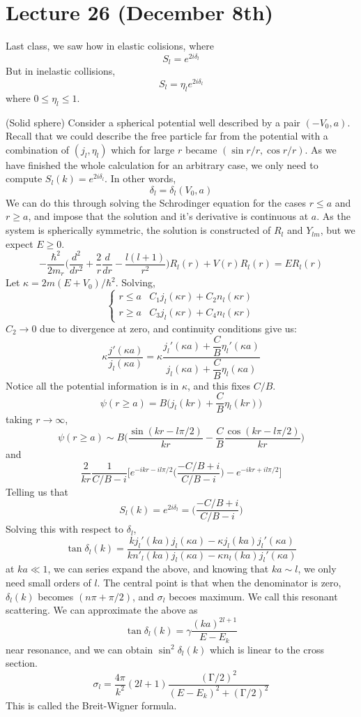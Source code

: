 \section{Lecture 26 (December 8th)}
\begin{recall}
Last class, we saw how in elastic colisions, where
\[S_{l}=e^{2i\delta _{l}}\]
But in inelastic collisions,
\[S_{l}=\eta _{l}e^{2i\delta _{l}}\]
where $0\leq \eta _{l}\leq 1$. 
\end{recall}
\vspace{2ex}
\begin{ex}
(Solid sphere) Consider a spherical potential well described by a pair $(-V_0,a)$. Recall that we could describe the free particle far from the potential with a combination of $(j_{l},\eta _{l})$ which for large $r$ became $(\sin r/r,\cos r/r)$. As we have finished the whole calculation for an arbitrary case, we only need to compute $S_{l}(k)=e^{2i\delta _{l}}$. In other words,
\[\delta _{l}=\delta _{l}(V_0,a)\]
We can do this through solving the Schrodinger equation for the cases $r\leq a$ and $r\geq a$, and impose that the solution and it's derivative is continuous at $a$. As the system is spherically symmetric, the solution is constructed of $R_{l}$ and $Y_{lm}$, but we expect $E\geq 0$. 
\[-\dfrac{\hbar ^2}{2m_{r}}\Big(\dfrac{d ^2}{d r^2}+\dfrac{2}{r}\dfrac{d }{d r}-\dfrac{l(l+1)}{r^2}  \Big)R_{l}(r)+V(r)R_{l}(r)=ER_{l}(r)\]
Let $\kappa =2m(E+V_0)/\hbar ^2$. Solving,
\[\begin{cases}
r\leq a& C_1j_{l}(\kappa r)+C_2n_{l}(\kappa r)\\
r\geq a& C_3j_{l}(\kappa r)+C_4n_{l}(\kappa r)
\end{cases}\]
$C_2\rightarrow 0$ due to divergence at zero, and continuity conditions give us:
\[\kappa \dfrac{j'(\kappa a)}{j_{l}(\kappa a)}=\kappa \dfrac{j_{l}'(\kappa a)+\dfrac{C}{B}\eta _{l}'(\kappa a)}{j_{l}(\kappa a)+\dfrac{C}{B}\eta _{l}(\kappa a)}\]
Notice all the potential information is in $\kappa $, and this fixes $C/B$. 
\[\psi (r\geq a)=B\Big(j_{l}(k r)+\dfrac{C}{B}\eta _{l}(k r)\Big)\]
taking $r\rightarrow \infty $, 
\[\psi (r\geq a)\sim B\Big(\dfrac{\sin (k r-l\pi /2)}{kr}-\dfrac{C}{B}\dfrac{\cos (kr-l\pi /2)}{kr}\Big)\]
and
\[\dfrac{2}{kr}\dfrac{1}{C/B-i}\Big[e^{-ikr-il\pi /2}\Big(\dfrac{-C/B+i}{C/B-i}\Big)-e^{-ikr+il\pi /2}\Big]\]
Telling us that 
\[S_{l}(k)=e^{2i\delta _{l}}=\Big(\dfrac{-C/B+i}{C/B-i}\Big)\]
Solving this with respect to $\delta _{l}$,
\[\tan \delta _{l}(k)=\dfrac{kj_{l}'(ka)j_{l}(\kappa a)-\kappa j_{l}(ka)j_{l}'(\kappa a)}{kn'_{l}(ka)j_{l}(\kappa a)-\kappa n_{l}(ka)j_{l}'(\kappa a)}\]
at $k a\ll 1$, we can series expand the above, and knowing that $ka\sim l$, we only need small orders of $l$. The central point is that when the denominator is zero, $\delta _{l}(k)$ becomes $(n\pi +\pi /2)$, and $\sigma _{l}$ becoes maximum. We call this resonant scattering. We can approximate the above as
\[\tan \delta _{l}(k)=\gamma \dfrac{(ka)^{2l+1}}{E-E_{k}}\]
near resonance, and we can obtain $\sin ^2\delta _{l}(k)$ which is linear to the cross section. 
\[\sigma _{l}=\dfrac{4\pi }{k^2}(2l+1)\dfrac{(\mathrm{\Gamma} /2)^2}{(E-E_{k})^2+(\mathrm{\Gamma} /2)^2}\]
This is called the Breit-Wigner formula. 
\end{ex}
